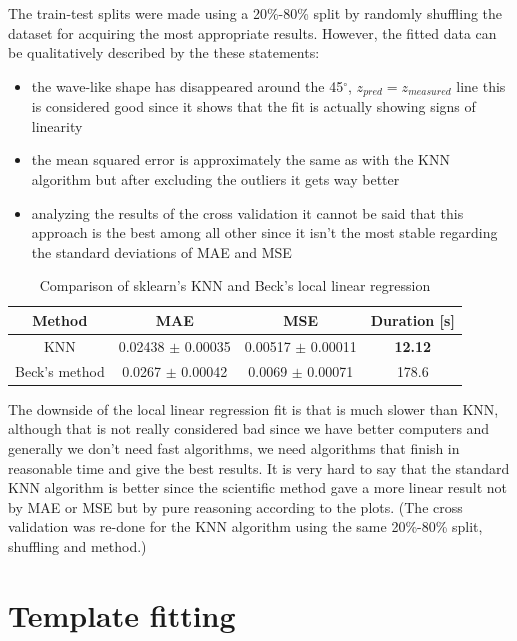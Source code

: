 \documentclass[a4paper,12pt]{article}
\begin{document}
\par The train-test splits were made using a 20\%-80\% split by randomly
shuffling the dataset for acquiring the most appropriate results. However,
the fitted data can be qualitatively described by the these statements:

\begin{itemize}
	\item the wave-like shape has disappeared around the 45$^{\circ}$,
	      $z_{pred} = z_{measured}$ line this is considered good since it shows
	      that the fit is actually showing signs of linearity
	\item the mean squared error is approximately the same as with the KNN
	      algorithm but after excluding the outliers it gets way better
	\item analyzing the results of the cross validation it cannot be said that this
	      approach is the best among all other since it isn't the most stable regarding
	      the standard deviations of MAE and MSE
\end{itemize}

\begin{table}[H]
	\centering
	\begin{tabular}{|c|c|c|c|}  \hline
		\textbf{Method} & \textbf{MAE}          & \textbf{MSE}          & \textbf{Duration [s]} \\ \hline
		KNN             & 0.02438 $\pm$ 0.00035 & 0.00517 $\pm$ 0.00011 & \textbf{12.12}        \\ \hline
		Beck's method   & 0.0267 $\pm$ 0.00042  & 0.0069 $\pm$ 0.00071  & 178.6                 \\ \hline
	\end{tabular}
	\caption{Comparison of sklearn's KNN and Beck's local linear regression}
\end{table}

\par The downside of the local linear regression fit is that is much slower than KNN,
although that is not really considered bad since we have better computers and generally
we don't need fast algorithms, we need algorithms that finish in reasonable time and give
the best results. It is very hard to say that the standard KNN algorithm is better
since the scientific method gave a more linear result not by MAE or MSE but by pure
reasoning according to the plots. (The cross validation was re-done for the KNN algorithm
using the same 20\%-80\% split, shuffling and method.)

\section{ Template fitting}
\end{document}
